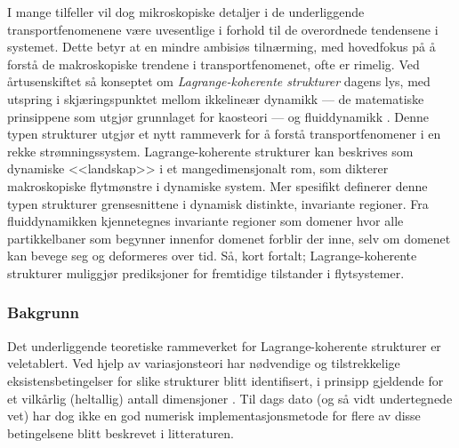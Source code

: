 I mange tilfeller vil dog mikroskopiske detaljer i de underliggende
transportfenomenene være uvesentlige i forhold til de overordnede tendensene
i systemet. Dette betyr at en mindre ambisiøs tilnærming, med hovedfokus på
å forstå de makroskopiske trendene i transportfenomenet, ofte er rimelig.
Ved årtusenskiftet så konseptet om \emph{Lagrange-koherente strukturer} dagens
lys, med utspring i skjæringspunktet mellom ikkelineær dynamikk --- de
matematiske prinsippene som utgjør grunnlaget for kaosteori --- og
fluiddynamikk \parencite{haller2000lagrangian}. Denne typen strukturer
utgjør et nytt rammeverk for å forstå transportfenomener i en rekke
strømningssystem. Lagrange-koherente strukturer kan beskrives som
dynamiske <<landskap>> i et mangedimensjonalt rom, som dikterer makroskopiske
flytmønstre i dynamiske system. Mer spesifikt definerer denne typen strukturer
grensesnittene i dynamisk distinkte, invariante regioner. Fra fluiddynamikken
kjennetegnes invariante regioner som domener hvor alle partikkelbaner som
begynner innenfor domenet forblir der inne, selv om domenet kan bevege seg
og deformeres over tid. Så, kort fortalt; Lagrange-koherente strukturer
muliggjør prediksjoner for fremtidige tilstander i flytsystemer.

\subsubsection*{Bakgrunn}

Det underliggende teoretiske rammeverket for Lagrange-koherente strukturer
er veletablert. Ved hjelp av variasjonsteori har nødvendige og
tilstrekkelige eksistensbetingelser for slike strukturer blitt identifisert,
i prinsipp gjeldende for et vilkårlig (heltallig) antall dimensjoner
\parencite{haller2010variational}. Til dags dato (og så vidt undertegnede vet)
har dog ikke en god numerisk implementasjonsmetode for flere av disse
betingelsene blitt beskrevet i litteraturen.

